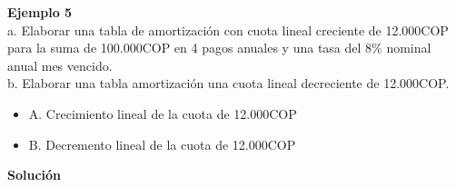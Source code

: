 \textbf{Ejemplo 5}\\
a. Elaborar una tabla de amortización  con cuota lineal creciente de   12.000COP para la suma de   100.000COP en 4 pagos anuales y una tasa del 8\% nominal anual mes vencido.\\
b. Elaborar una tabla amortización una cuota lineal decreciente de   12.000COP.\\

\begin{itemize}
	\item A. Crecimiento lineal de la cuota de   12.000COP
	\item B. Decremento lineal de la cuota de  12.000COP \\
\end{itemize}

\textbf{Solución}\\
